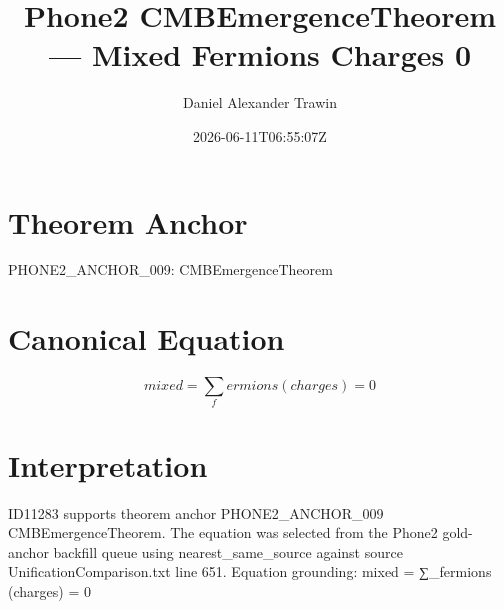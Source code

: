 \documentclass[11pt]{article}
\title{Phone2 CMBEmergenceTheorem — Mixed Fermions Charges 0}
\author{Daniel Alexander Trawin}
\date{2026-06-11T06:55:07Z}
\begin{document}
\maketitle
\section*{Theorem Anchor}
PHONE2_ANCHOR_009: CMBEmergenceTheorem
\section*{Canonical Equation}
\[
mixed = ∑_fermions (charges) = 0
\]
\section*{Interpretation}
ID11283 supports theorem anchor PHONE2_ANCHOR_009 CMBEmergenceTheorem. The equation was selected from the Phone2 gold-anchor backfill queue using nearest_same_source against source UnificationComparison.txt line 651. Equation grounding: mixed = ∑_fermions (charges) = 0
\end{document}
